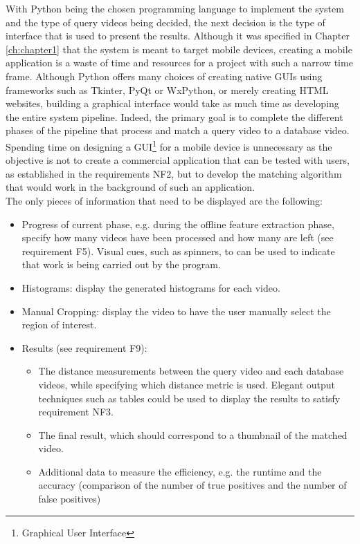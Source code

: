 With Python being the chosen programming language to implement the system and the type of query videos being decided, the next decision is the type of interface that is used to present the results. Although it was specified in Chapter \ref{ch:chapter1} that the system is meant to target mobile devices, creating a mobile application is a waste of time and resources for a project with such a narrow time frame. Although Python offers many choices of creating native GUIs using frameworks such as Tkinter, PyQt or WxPython, or merely creating HTML websites, building a graphical interface would take as much time as developing the entire system pipeline. Indeed, the primary goal is to complete the different phases of the pipeline that process and match a query video to a database video. Spending time on designing a GUI\footnote{Graphical User Interface} for a mobile device is unnecessary as the objective is not to create a commercial application that can be tested with users, as established in the requirements NF2, but to develop the matching algorithm that would work in the background of such an application.\\

The only pieces of information that need to be displayed are the following:
\begin{itemize}
    \item Progress of current phase, e.g. during the offline feature extraction phase, specify how many videos have been processed and how many are left (see requirement F5). Visual cues, such as spinners, to can be used to indicate that work is being carried out by the program.
    \item Histograms: display the generated histograms for each video.
    \item Manual Cropping: display the video to have the user manually select the region of interest.
    \item Results (see requirement F9):
    \begin{itemize}
        \item The distance measurements between the query video and each database videos, while specifying which distance metric is used. Elegant output techniques such as tables could be used to display the results to satisfy requirement NF3.
        \item The final result, which should correspond to a thumbnail of the matched video.
        \item Additional data to measure the efficiency, e.g. the runtime and the accuracy (comparison of the number of true positives and the number of false positives)
    \end{itemize}
\end{itemize}

